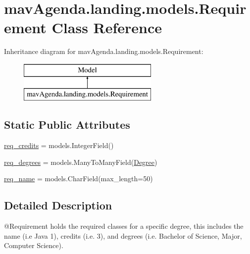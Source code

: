 \hypertarget{classmavAgenda_1_1landing_1_1models_1_1Requirement}{}\section{mav\+Agenda.\+landing.\+models.\+Requirement Class Reference}
\label{classmavAgenda_1_1landing_1_1models_1_1Requirement}
Inheritance diagram for mav\+Agenda.\+landing.\+models.\+Requirement\+:\begin{figure}[H]
\begin{center}
\leavevmode
\includegraphics[height=2.000000cm]{classmavAgenda_1_1landing_1_1models_1_1Requirement}
\end{center}
\end{figure}
\subsection*{Static Public Attributes}
\begin{DoxyCompactItemize}
\item 
\mbox{\hyperlink{classmavAgenda_1_1landing_1_1models_1_1Requirement_a9f7802f261cda2a61dd20df1abb8baa1}{req\+\_\+credits}} = models.\+Integer\+Field()
\item 
\mbox{\hyperlink{classmavAgenda_1_1landing_1_1models_1_1Requirement_a2e3ee5f7b261f8af6d468229ab464ce0}{req\+\_\+degrees}} = models.\+Many\+To\+Many\+Field(\mbox{\hyperlink{classmavAgenda_1_1landing_1_1models_1_1Degree}{Degree}})
\item 
\mbox{\hyperlink{classmavAgenda_1_1landing_1_1models_1_1Requirement_a026ad9c0ee83c7deedf00b989133fd84}{req\+\_\+name}} = models.\+Char\+Field(max\+\_\+length=50)
\end{DoxyCompactItemize}


\subsection{Detailed Description}
\begin{DoxyVerb}@Requirement holds the required classes for a specific degree, this includes the
        name (i.e Java 1), credits (i.e. 3),
        and degrees (i.e. Bachelor of Science, Major, Computer Science).
\end{DoxyVerb}
 

